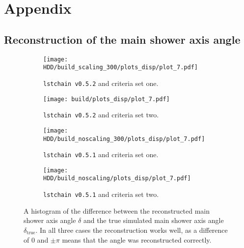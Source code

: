\chapter{Appendix}

\section{Reconstruction of the main shower axis angle}
\begin{figure}
    \centering
    \begin{subfigure}{0.49\textwidth}
        \centering
        \texttt{[image: HDD/build\_scaling\_300/plots\_disp/plot\_7.pdf]}
        \caption{\texttt{lstchain v0.5.2} and criteria set one.}
    \end{subfigure}
    \hfill
    \begin{subfigure}{0.49\textwidth}
        \centering
        \texttt{[image: build/plots\_disp/plot\_7.pdf]}
        \caption{\texttt{lstchain v0.5.2} and criteria set two.}
    \end{subfigure}
    \newline\vfill
    \begin{subfigure}{0.49\textwidth}
        \centering
        \texttt{[image: HDD/build\_noscaling\_300/plots\_disp/plot\_7.pdf]}
        \caption{\texttt{lstchain v0.5.1} and criteria set one.}
    \end{subfigure}
    \hfill
    \begin{subfigure}{0.49\textwidth}
        \centering
        \texttt{[image: HDD/build\_noscaling/plots\_disp/plot\_7.pdf]}
        \caption{\texttt{lstchain v0.5.1} and criteria set two.}
    \end{subfigure}
    \caption{A histogram of the difference between the reconstructed main shower axis angle $\delta$ and the true simulated main shower axis angle $\delta_\text{true}$.
        In all three cases the reconstruction works well, as a difference of $\num{0}$ and $\pm \pi$ means that the angle was reconstructed correctly.
    }
    \label{fig:delta_comparison}
\end{figure}


